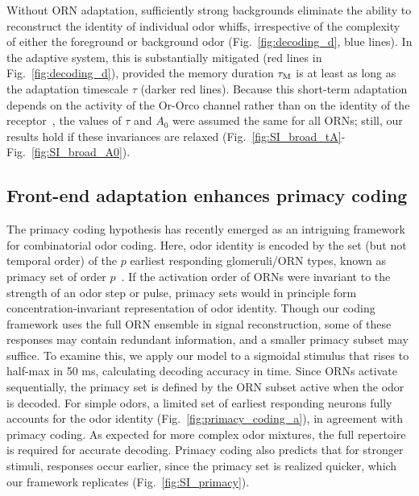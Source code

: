 \documentclass[10pt,prl,aps,showpacs,twocolumn,unsortedaddress,showkeys,linenumbers]{revtex4-1}
\begin{document}
Without ORN adaptation, sufficiently strong backgrounds eliminate the ability to reconstruct the identity of individual odor whiffs, irrespective of the complexity of either the foreground or background odor (Fig.~\ref{fig:decoding_d}, blue lines). In the adaptive system, this is substantially mitigated (red lines in Fig.~\ref{fig:decoding_d}), provided the memory duration $\tau_{\textup {M}}$ is at least as long as the adaptation timescale $\tau$ (darker red lines). Because this short-term adaptation depends on the activity of the Or-Orco channel rather than on the identity of the receptor~\cite{nagel_wilson_biophysical,martelli,srinivas_elife}, the values of $\tau$ and $A_{0}$ were assumed the same for all ORNs; still, our results hold if these invariances are relaxed (Fig.~\ref{fig:SI_broad_tA}-Fig.~\ref{fig:SI_broad_A0}). 





\subsection*{Front-end adaptation enhances primacy coding}

The primacy coding hypothesis has recently emerged as an intriguing framework for combinatorial odor coding. Here, odor identity is encoded by the set (but not temporal order) of the $p$ earliest responding glomeruli/ORN types, known as primacy set of order $p$~\cite{primacy_coding}. If the activation order of ORNs were invariant to the strength of an odor step or pulse, primacy sets would in principle form concentration-invariant representation of odor identity. Though our coding framework uses the full ORN ensemble in signal reconstruction, some of these responses may contain redundant information, and a smaller primacy subset may suffice. To examine this, we apply our model to a sigmoidal stimulus that rises to half-max in 50 ms, calculating decoding accuracy in time. Since ORNs activate sequentially, the primacy set is defined by the ORN subset active when the odor is decoded. For simple odors, a limited set of earliest responding neurons fully accounts for the odor identity (Fig.~\ref{fig:primacy_coding_a}), in agreement with primacy coding. As expected for more complex odor mixtures, the full repertoire is required for accurate decoding. Primacy coding also predicts that for stronger stimuli, responses occur earlier, since the primacy set is realized quicker, which our framework replicates (Fig.~\ref{fig:SI_primacy}).
\end{document}
